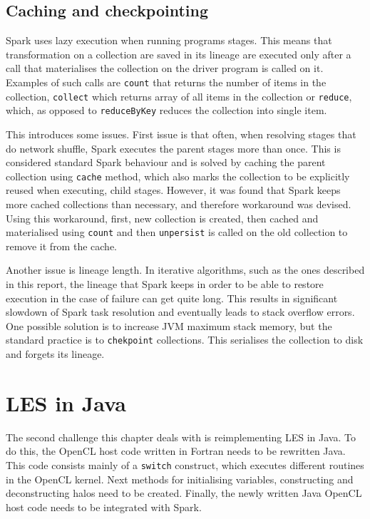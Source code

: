 \documentclass{l4proj}
\begin{document}
\section{Caching and checkpointing}

Spark uses lazy execution when running programs stages. This means that transformation
on a collection are saved in its lineage are executed only after a call
that materialises the collection on the driver program is called on it. Examples of such calls are
\texttt{count} that returns the number of items in the collection, \texttt{collect}
which returns array of all items in the collection or \texttt{reduce}, which, as opposed
to \texttt{reduceByKey} reduces the collection into single item.

This introduces some issues. First issue is that often, when resolving stages that
do network shuffle, Spark executes the parent stages more than once. This is
considered standard Spark behaviour and is solved by caching the parent collection
using \texttt{cache} method, which also marks the collection to be explicitly reused
when executing, child stages. However, it was found that Spark keeps more cached collections
than necessary, and therefore workaround was devised. Using this workaround, first,
new collection is created, then cached and materialised using \texttt{count} and 
then \texttt{unpersist} is called on the old collection to remove it from the cache.

Another issue is lineage length. In iterative algorithms, such as the ones described 
in this report, the lineage that Spark keeps in order to be able to restore execution
in the case of failure can get quite long. This results in significant slowdown of
Spark task resolution and eventually leads to stack overflow errors. One possible
solution is to increase JVM maximum stack memory, but the standard practice is to
\texttt{chekpoint} collections. This serialises the collection to disk and forgets
its lineage.

\chapter{LES in Java}
\label{chap:les_java}

The second challenge this chapter deals with is reimplementing LES in Java.
To do this, the OpenCL host code written in Fortran needs to be rewritten 
Java. This code consists mainly of a \texttt{switch} construct, which executes
different routines in the OpenCL kernel. Next methods for initialising variables,
constructing and deconstructing halos need to be created. Finally, the newly 
written Java OpenCL host code needs to be integrated with Spark.
\end{document}
